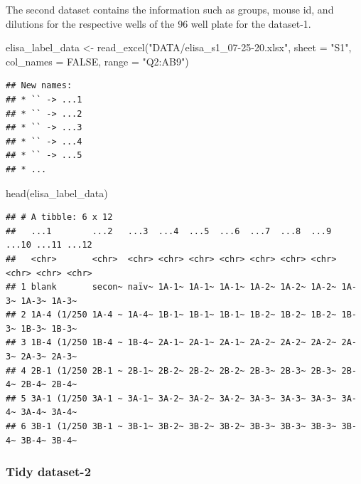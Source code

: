 \documentclass[
]{book}
\newenvironment{Shaded}{\begin{snugshade}}{\end{snugshade}}
\newcommand{\AttributeTok}[1]{\textcolor[rgb]{0.77,0.63,0.00}{#1}}
\newcommand{\ConstantTok}[1]{\textcolor[rgb]{0.00,0.00,0.00}{#1}}
\newcommand{\FunctionTok}[1]{\textcolor[rgb]{0.00,0.00,0.00}{#1}}
\newcommand{\NormalTok}[1]{#1}
\newcommand{\OtherTok}[1]{\textcolor[rgb]{0.56,0.35,0.01}{#1}}
\newcommand{\StringTok}[1]{\textcolor[rgb]{0.31,0.60,0.02}{#1}}
\begin{document}
The second dataset contains the information such as groups, mouse id, and dilutions for the respective wells of the 96 well plate for the dataset-1.

\begin{Shaded}
\begin{Highlighting}[]
\NormalTok{elisa\_label\_data }\OtherTok{\textless{}{-}} \FunctionTok{read\_excel}\NormalTok{(}\StringTok{"DATA/elisa\_s1\_07{-}25{-}20.xlsx"}\NormalTok{, }
                               \AttributeTok{sheet =} \StringTok{"S1"}\NormalTok{, }\AttributeTok{col\_names =} \ConstantTok{FALSE}\NormalTok{,  }
                               \AttributeTok{range =} \StringTok{"Q2:AB9"}\NormalTok{)}
\end{Highlighting}
\end{Shaded}

\begin{verbatim}
## New names:
## * `` -> ...1
## * `` -> ...2
## * `` -> ...3
## * `` -> ...4
## * `` -> ...5
## * ...
\end{verbatim}

\begin{Shaded}
\begin{Highlighting}[]
\FunctionTok{head}\NormalTok{(elisa\_label\_data)}
\end{Highlighting}
\end{Shaded}

\begin{verbatim}
## # A tibble: 6 x 12
##   ...1        ...2   ...3  ...4  ...5  ...6  ...7  ...8  ...9  ...10 ...11 ...12
##   <chr>       <chr>  <chr> <chr> <chr> <chr> <chr> <chr> <chr> <chr> <chr> <chr>
## 1 blank       secon~ naïv~ 1A-1~ 1A-1~ 1A-1~ 1A-2~ 1A-2~ 1A-2~ 1A-3~ 1A-3~ 1A-3~
## 2 1A-4 (1/250 1A-4 ~ 1A-4~ 1B-1~ 1B-1~ 1B-1~ 1B-2~ 1B-2~ 1B-2~ 1B-3~ 1B-3~ 1B-3~
## 3 1B-4 (1/250 1B-4 ~ 1B-4~ 2A-1~ 2A-1~ 2A-1~ 2A-2~ 2A-2~ 2A-2~ 2A-3~ 2A-3~ 2A-3~
## 4 2B-1 (1/250 2B-1 ~ 2B-1~ 2B-2~ 2B-2~ 2B-2~ 2B-3~ 2B-3~ 2B-3~ 2B-4~ 2B-4~ 2B-4~
## 5 3A-1 (1/250 3A-1 ~ 3A-1~ 3A-2~ 3A-2~ 3A-2~ 3A-3~ 3A-3~ 3A-3~ 3A-4~ 3A-4~ 3A-4~
## 6 3B-1 (1/250 3B-1 ~ 3B-1~ 3B-2~ 3B-2~ 3B-2~ 3B-3~ 3B-3~ 3B-3~ 3B-4~ 3B-4~ 3B-4~
\end{verbatim}

\hypertarget{tidy-dataset-2}{%
\subsubsection{Tidy dataset-2}\label{tidy-dataset-2}}
\end{document}
